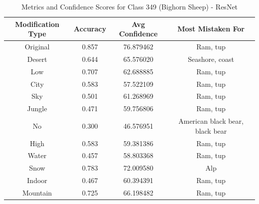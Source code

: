 \begin{table}
	\centering
	\begin{tabular}{|c|c|c|c|}
		\hline
		\textbf{Modification Type} & \textbf{Accuracy} & \textbf{Avg Confidence} & \textbf{Most Mistaken For} \\
		\hline
		Original & 0.857 & 76.879462 & Ram, tup \\
		\hline
		Desert & 0.644 & 65.576020 & Seashore, coast \\
		\hline
		Low & 0.707 & 62.688885 & Ram, tup \\
		\hline
		City & 0.583 & 57.522109 & Ram, tup \\
		\hline
		Sky & 0.501 & 61.268969 & Ram, tup \\
		\hline
		Jungle & 0.471 & 59.756806 & Ram, tup \\
		\hline
		No & 0.300 & 46.576951 & American black bear, black bear \\
		\hline
		High & 0.583 & 59.381386 & Ram, tup \\
		\hline
		Water & 0.457 & 58.803368 & Ram, tup \\
		\hline
		Snow & 0.783 & 72.009580 & Alp \\
		\hline
		Indoor & 0.467 & 60.394391 & Ram, tup \\
		\hline
		Mountain & 0.725 & 66.198482 & Ram, tup \\
		\hline
	\end{tabular}
	\caption{Metrics and Confidence Scores for Class 349 (Bighorn Sheep) - ResNet}
	\label{tab:metrics_confidence_class_349_resnet}
\end{table}


